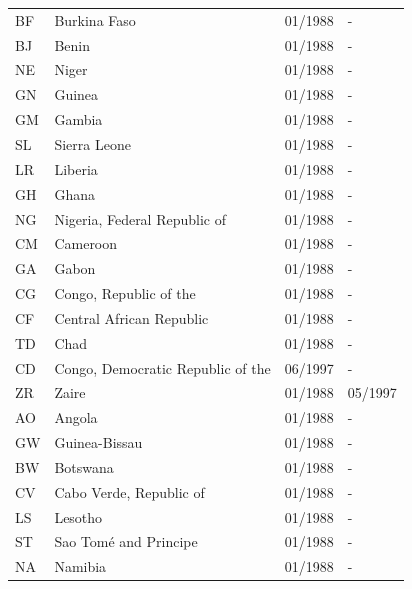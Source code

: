\begin{footnotesize}
\begin{longtable}{p{0.5cm}p{9cm}p{2cm}p{2cm}}
BF	&	Burkina Faso	&	01/1988	&	-	\\

BJ	&	Benin	&	01/1988	&	-	\\

NE	&	Niger	&	01/1988	&	-	\\

GN	&	Guinea	&	01/1988	&	-	\\

GM	&	Gambia	&	01/1988	&	-	\\

SL	&	Sierra Leone	&	01/1988	&	-	\\

LR	&	Liberia	&	01/1988	&	-	\\

GH	&	Ghana	&	01/1988	&	-	\\

NG	&	Nigeria, Federal Republic of	&	01/1988	&	-	\\

CM	&	Cameroon	&	01/1988	&	-	\\

GA	&	Gabon	&	01/1988	&	-	\\

CG	&	Congo, Republic of the	&	01/1988	&	-	\\

CF	&	Central African Republic	&	01/1988	&	-	\\

TD	&	Chad	&	01/1988	&	-	\\

CD	&	Congo, Democratic Republic of the	&	06/1997	&	-	\\

ZR	&	Zaire	&	01/1988	&	05/1997	\\

AO	&	Angola	&	01/1988	&	-	\\

GW	&	Guinea-Bissau	&	01/1988	&	-	\\

BW	&	Botswana	&	01/1988	&	-	\\

CV	&	Cabo Verde, Republic of	&	01/1988	&	-	\\

LS	&	Lesotho	&	01/1988	&	-	\\

ST	&	Sao Tomé and Principe	&	01/1988	&	-	\\

NA	&	Namibia	&	01/1988	&	-	\\


\end{longtable}
\end{footnotesize}
